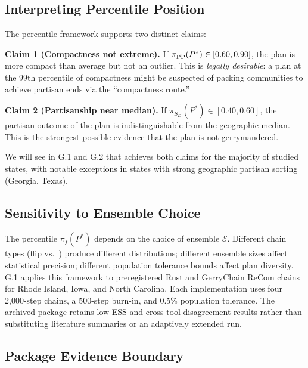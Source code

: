 \subsection{Interpreting Percentile Position}

The percentile framework supports two distinct claims:

\begin{keybox}
\textbf{Claim 1 (Compactness not extreme).}
If $\pi_{\bar{\mathrm{PP}}}(P^*) \in [0.60, 0.90]$, the \ar{} plan is more compact
than average but not an outlier.  This is \emph{legally desirable}: a plan
at the 99th percentile of compactness might be suspected of packing
communities to achieve partisan ends via the ``compactness route.''

\textbf{Claim 2 (Partisanship near median).}
If $\pi_{S_D}(P^*) \in [0.40, 0.60]$, the partisan outcome of the \ar{}
plan is indistinguishable from the geographic median.  This is the
strongest possible evidence that the plan is not gerrymandered.
\end{keybox}

We will see in G.1 and G.2 that \ar{} achieves both claims for the majority
of studied states, with notable exceptions in states with strong geographic
partisan sorting (Georgia, Texas).

\subsection{Sensitivity to Ensemble Choice}

The percentile $\pi_f(P^*)$ depends on the choice of ensemble $\mathcal{E}$.
Different chain types (flip vs.\ \recom{}) produce different distributions;
different ensemble sizes affect statistical precision; different population
tolerance bounds affect plan diversity. G.1 applies this framework to
preregistered Rust and GerryChain ReCom chains for Rhode Island, Iowa, and
North Carolina. Each implementation uses four 2,000-step chains, a 500-step
burn-in, and 0.5\% population tolerance. The archived package retains low-ESS
and cross-tool-disagreement results rather than substituting literature
summaries or an adaptively extended run.

\subsection{Package Evidence Boundary}

